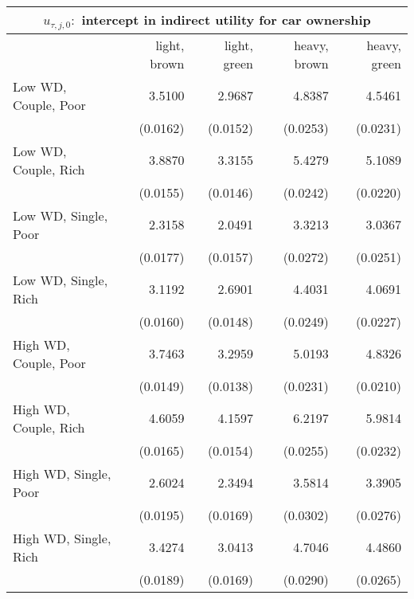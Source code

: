 \begin{tabular}{lrrrr} 
\toprule 
\multicolumn{5}{c}{$u_{\tau,j,0} : $ intercept in indirect utility for car ownership} \\ 
\midrule
                                & light, brown   & light, green   & heavy, brown   & heavy, green  \\ 
\midrule 
          Low WD, Couple, Poor  &       3.5100   &       2.9687   &       4.8387   &       4.5461  \\ 
                                & (0.0162)   & (0.0152)   & (0.0253)   & (0.0231)  \\ 
          Low WD, Couple, Rich  &       3.8870   &       3.3155   &       5.4279   &       5.1089  \\ 
                                & (0.0155)   & (0.0146)   & (0.0242)   & (0.0220)  \\ 
          Low WD, Single, Poor  &       2.3158   &       2.0491   &       3.3213   &       3.0367  \\ 
                                & (0.0177)   & (0.0157)   & (0.0272)   & (0.0251)  \\ 
          Low WD, Single, Rich  &       3.1192   &       2.6901   &       4.4031   &       4.0691  \\ 
                                & (0.0160)   & (0.0148)   & (0.0249)   & (0.0227)  \\ 
         High WD, Couple, Poor  &       3.7463   &       3.2959   &       5.0193   &       4.8326  \\ 
                                & (0.0149)   & (0.0138)   & (0.0231)   & (0.0210)  \\ 
         High WD, Couple, Rich  &       4.6059   &       4.1597   &       6.2197   &       5.9814  \\ 
                                & (0.0165)   & (0.0154)   & (0.0255)   & (0.0232)  \\ 
         High WD, Single, Poor  &       2.6024   &       2.3494   &       3.5814   &       3.3905  \\ 
                                & (0.0195)   & (0.0169)   & (0.0302)   & (0.0276)  \\ 
         High WD, Single, Rich  &       3.4274   &       3.0413   &       4.7046   &       4.4860  \\ 
                                & (0.0189)   & (0.0169)   & (0.0290)   & (0.0265)  \\ 
\bottomrule \end{tabular} 
